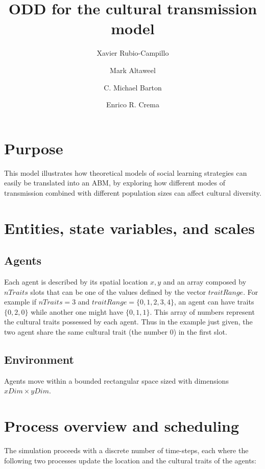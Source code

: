 \documentclass[11pt,a4paper,twocolumn,notitlepage]{article}
\begin{document}
\title{ODD for the cultural transmission model}
\author{Xavier Rubio-Campillo \and Mark Altaweel \and C. Michael Barton \and Enrico R. Crema}
\maketitle

\section{Purpose}

This model illustrates how theoretical models of social learning strategies \citep{boyd1985,henrich_mcelreath2003,laland2004,mesoudi_2011} can easily be translated into an ABM, by exploring how different modes of transmission combined with different population sizes can affect cultural diversity.


\section{Entities, state variables, and scales}
\subsection{Agents}

Each agent is described by its spatial location $x,y$ and an array composed by $nTraits$ slots that can be one of the values defined by the vector $traitRange$. For example if $nTraits=3$ and $traitRange=\{0,1,2,3,4\}$, an agent can have traits $\{0,2,0\}$ while another one might have $\{0,1,1\}$. This array of numbers represent the cultural traits possessed by each agent. Thus in the example just given, the two agent share the same cultural trait (the number $0$) in the first slot.

\subsection{Environment}

Agents move within a bounded rectangular space sized with dimensions $xDim \times yDim$.

\section{Process overview and scheduling}

The simulation proceeds with a discrete number of time-steps, each where the following two processes update the location and the cultural traits of the agents:
\end{document}
